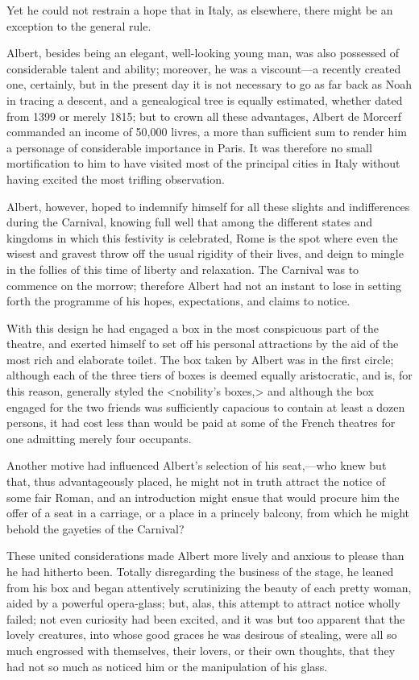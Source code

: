 Yet he could not restrain a hope that in Italy, as elsewhere, there might be an exception to the general rule. 

 Albert, besides being an elegant, well-looking young man, was also possessed of considerable talent and ability; moreover, he was a viscount—a recently created one, certainly, but in the present day it is not necessary to go as far back as Noah in tracing a descent, and a genealogical tree is equally estimated, whether dated from 1399 or merely 1815; but to crown all these advantages, Albert de Morcerf commanded an income of 50,000 livres, a more than sufficient sum to render him a personage of considerable importance in Paris. It was therefore no small mortification to him to have visited most of the principal cities in Italy without having excited the most trifling observation. 

 Albert, however, hoped to indemnify himself for all these slights and indifferences during the Carnival, knowing full well that among the different states and kingdoms in which this festivity is celebrated, Rome is the spot where even the wisest and gravest throw off the usual rigidity of their lives, and deign to mingle in the follies of this time of liberty and relaxation. The Carnival was to commence on the morrow; therefore Albert had not an instant to lose in setting forth the programme of his hopes, expectations, and claims to notice. 

 With this design he had engaged a box in the most conspicuous part of the theatre, and exerted himself to set off his personal attractions by the aid of the most rich and elaborate toilet. The box taken by Albert was in the first circle; although each of the three tiers of boxes is deemed equally aristocratic, and is, for this reason, generally styled the <nobility's boxes,> and although the box engaged for the two friends was sufficiently capacious to contain at least a dozen persons, it had cost less than would be paid at some of the French theatres for one admitting merely four occupants. 

 Another motive had influenced Albert's selection of his seat,—who knew but that, thus advantageously placed, he might not in truth attract the notice of some fair Roman, and an introduction might ensue that would procure him the offer of a seat in a carriage, or a place in a princely balcony, from which he might behold the gayeties of the Carnival? 

 These united considerations made Albert more lively and anxious to please than he had hitherto been. Totally disregarding the business of the stage, he leaned from his box and began attentively scrutinizing the beauty of each pretty woman, aided by a powerful opera-glass; but, alas, this attempt to attract notice wholly failed; not even curiosity had been excited, and it was but too apparent that the lovely creatures, into whose good graces he was desirous of stealing, were all so much engrossed with themselves, their lovers, or their own thoughts, that they had not so much as noticed him or the manipulation of his glass. 

